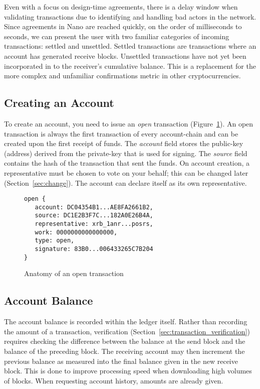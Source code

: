 Even with a focus on design-time agreements, there is a delay window when validating transactions due to identifying and handling bad actors in the network. Since agreements in Nano are reached quickly, on the order of milliseconds to seconds, we can present the user with two familiar categories of incoming transactions: settled and unsettled. Settled transactions are transactions where an account has generated receive blocks. Unsettled transactions have not yet been incorporated in to the receiver's cumulative balance. This is a replacement for the more complex and unfamiliar confirmations metric in other cryptocurrencies.

\subsection{Creating an Account}\label{sec:open}
To create an account, you need to issue an \textit{open} transaction (Figure~\ref{code:open}). An open transaction is always the first transaction of every account-chain and can be created upon the first receipt of funds. The \textit{account} field stores the public-key (address) derived from the private-key that is used for signing. The \textit{source} field contains the hash of the transaction that sent the funds. On account creation, a representative must be chosen to vote on your behalf; this can be changed later (Section~\ref{sec:change}). The account can declare itself as its own representative.

\begin{figure}[!ht]
\begin{lstlisting}
open {
   account: DC04354B1...AE8FA2661B2,
   source: DC1E2B3F7C...182A0E26B4A,
   representative: xrb_1anr...posrs,
   work: 0000000000000000,
   type: open,
   signature: 83B0...006433265C7B204
}
\end{lstlisting}
\caption{Anatomy of an open transaction}
\label{code:open}
\end{figure}

\subsection{Account Balance}\label{sec:account_balance}
The account balance is recorded within the ledger itself. Rather than recording the amount of a transaction, verification (Section~\ref{sec:transaction_verification}) requires checking the difference between the balance at the send block and the balance of the preceding block. The receiving account may then increment the previous balance as measured into the final balance given in the new receive block. This is done to improve processing speed when downloading high volumes of blocks. When requesting account history, amounts are already given.


